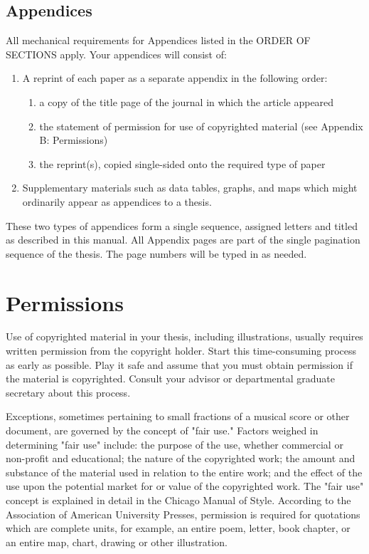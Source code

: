 \documentclass[draft]{ua-thesis}
\begin{document}
\section{Appendices}
All mechanical requirements for Appendices listed in the ORDER
OF SECTIONS apply. Your appendices will consist of:
\begin{enumerate}
  \item A reprint of each paper as a separate appendix in the following
  order: 
       \begin{enumerate}
       \item a copy of the title page of the journal in which the article
          appeared
       \item the statement of permission for use of copyrighted material (see
          Appendix B: Permissions)
       \item the reprint(s), copied single-sided onto the required type of
          paper
       \end{enumerate}
  \item Supplementary materials such as data tables, graphs, and maps which
     might ordinarily appear as appendices to a thesis.
\end{enumerate}
These two types of appendices form a single sequence, assigned letters and
titled as described in this manual. All Appendix pages are part of the
single pagination sequence of the thesis. The page numbers will be typed in
as needed.


\chapter{Permissions}

Use of copyrighted material in your thesis, including illustrations, usually
requires written permission from the copyright holder. Start this
time-consuming process as early as possible. Play it safe and assume that
you must obtain permission if the material is copyrighted. Consult your
advisor or departmental graduate secretary about this process.

Exceptions, sometimes pertaining to small fractions of a musical score or
other document, are governed by the concept of "fair use." Factors weighed
in determining "fair use" include: the purpose of the use, whether
commercial or non-profit and educational; the nature of the copyrighted
work; the amount and substance of the material used in relation to the
entire work; and the effect of the use upon the potential market for or
value of the copyrighted work. The "fair use" concept is explained in detail
in the Chicago Manual of Style. According to the Association of American
University Presses, permission is required for quotations which are complete
units, for example, an entire poem, letter, book chapter, or an entire map,
chart, drawing or other illustration.
\end{document}
